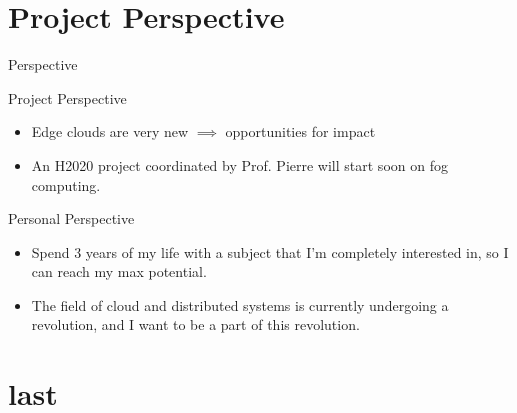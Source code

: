 \documentclass{beamer}
\begin{document}
  
    

 

\section{Project Perspective}
\begin{frame}{Perspective}

\begin{block}{Project Perspective}
    \begin{itemize}
    
    \item  Edge clouds are very new $ \implies $ opportunities for impact
    \item<2-> An H2020 project coordinated by Prof. Pierre will start soon on fog computing.
    
      
    \end{itemize}
    
    \end{block}

\begin{block}{Personal Perspective}
    \begin{itemize}
    
    \item<3-> Spend 3 years of my life with a subject that I'm completely interested in, so I can reach my max potential.
    
    \item<4-> The field of cloud and distributed systems is currently undergoing a revolution, and I want to be a part of this revolution.
   
   
    
    \end{itemize}
    
    \end{block}
   
    


\end{frame}


\section*{last}
\end{document}
